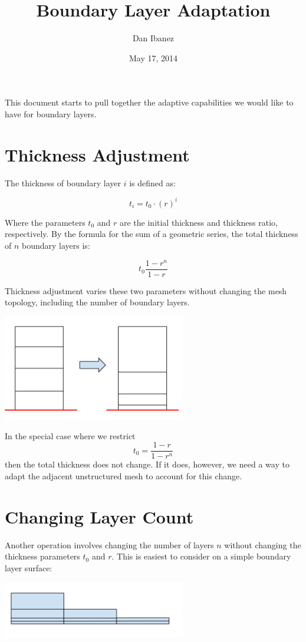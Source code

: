 \documentclass{article}
\title{Boundary Layer Adaptation}
\author{Dan Ibanez}
\date{May 17, 2014}
\begin{document}
\maketitle

This document starts to pull together the adaptive
capabilities we would like to have for boundary
layers.

\section{Thickness Adjustment}

The thickness of boundary layer $i$ is defined as:

\[t_i = t_0\cdot (r)^i\]

Where the parameters $t_0$ and $r$ are the initial
thickness and thickness ratio, respectively.
By the formula for the sum of a geometric series,
the total thickness of $n$ boundary layers is:

\[t_0\frac{1-r^n}{1-r}\]

Thickness adjustment varies these two parameters without
changing the mesh topology, including the number of boundary
layers.

\includegraphics[width=0.6\textwidth]{thick_adapt.png}

In the special case where we restrict
\[t_0 = \frac{1-r}{1-r^n}\]
then the total thickness does not change.
If it does, however, we need a way to adapt the adjacent
unstructured mesh to account for this change.

\section{Changing Layer Count}

Another operation involves changing the number of layers $n$
without changing the thickness parameters $t_0$ and $r$.
This is easiest to consider on a simple boundary layer surface:

\includegraphics[width=0.6\textwidth]{layer_step.png}
\end{document}

